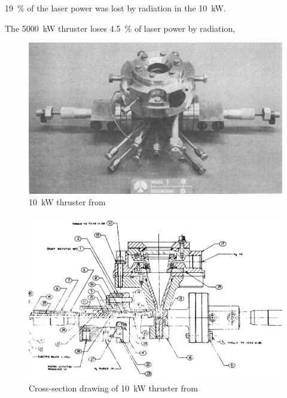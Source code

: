         \qty{19}{\%} of the laser power was lost by radiation in the \qty{10}{kW}. 
        
        The \qty{5000}{kW} thruster loses \qty{4.5}{\%} of laser power by radiation, 

        \begin{figure}[h!]
            \centering
            \includegraphics[width=\textwidth]{assets/2 background/Shoji_assy.png}
            \caption{\qty{10}{kW} thruster from \textcite{shojiPerformanceHeatTransfer1976a}}
            \label{fig:Shoji apparatus}
        \end{figure}

        \begin{figure}[h!]
            \centering
            \includegraphics[width=\textwidth]{assets/2 background/Shoji cross-section.png}
            \caption{Cross-section drawing of \qty{10}{kW} thruster from \textcite{shojiLaserheatedRocketThruster1977}}
            \label{fig:Shoji cross-section}
        \end{figure}

